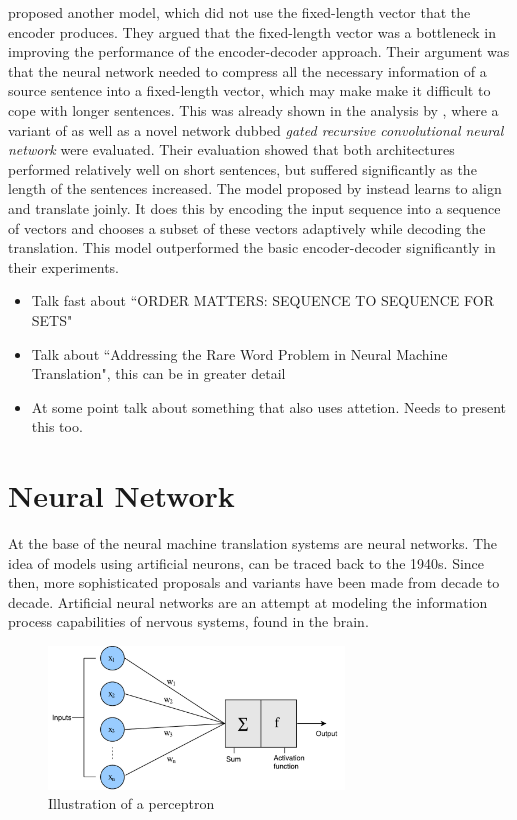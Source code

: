 \citep{bahdanau2014neural} proposed another model, which did not use the fixed-length vector that the encoder produces. They argued that the fixed-length vector was a bottleneck in improving the performance of the encoder-decoder approach. Their argument was that the neural network needed to compress all the necessary information of a source sentence into a fixed-length vector, which may make make it difficult to cope with longer sentences. This was already shown in the analysis by \citep{cho2014properties}, where a variant of \citep{cho2014learning} as well as a novel network dubbed \textit{gated recursive convolutional neural network} were evaluated. Their evaluation showed that both architectures performed relatively well on short sentences, but suffered significantly as the length of the sentences increased. The model proposed by \citep{bahdanau2014neural} instead learns to align and translate joinly. It does this by encoding the input sequence into a sequence of vectors and chooses a subset of these vectors adaptively while decoding the translation. This model outperformed the basic encoder-decoder significantly in their experiments.

\begin{itemize}
    \item Talk fast about ``ORDER MATTERS: SEQUENCE TO SEQUENCE FOR SETS"
    \item Talk about ``Addressing the Rare Word Problem in Neural Machine Translation", this can be in greater detail
    \item At some point talk about something that also uses attetion. Needs to present this too.
\end{itemize}


\section{Neural Network}
At the base of the neural machine translation systems are neural networks. The idea of models using artificial neurons, can be traced back to the 1940s. Since then, more sophisticated proposals and variants have been made from decade to decade. Artificial neural networks are an attempt at modeling the information process capabilities of nervous systems, found in the brain.

\begin{figure}[ht]
    \centering
    \includegraphics[width=0.7\textwidth]{fig/related_work/nn_perceptron.pdf}
    \caption{Illustration of a perceptron}
    \label{fig:nn-perceptron}
\end{figure}

